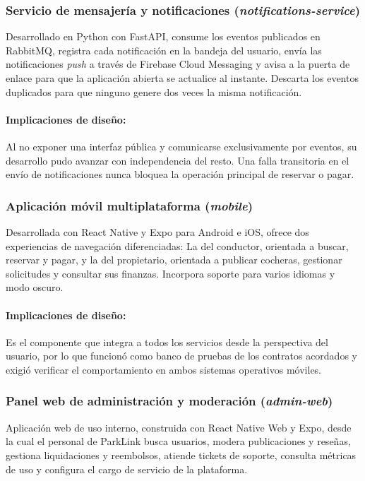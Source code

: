 \subsubsection{Servicio de mensajería y notificaciones (\textit{notifications-service})}

Desarrollado en Python con FastAPI, consume los eventos publicados en RabbitMQ, registra cada notificación en la bandeja del usuario, envía las notificaciones \textit{push} a través de Firebase Cloud Messaging y avisa a la puerta de enlace para que la aplicación abierta se actualice al instante. Descarta los eventos duplicados para que ninguno genere dos veces la misma notificación.

\paragraph{Implicaciones de diseño:} Al no exponer una interfaz pública y comunicarse exclusivamente por eventos, su desarrollo pudo avanzar con independencia del resto. Una falla transitoria en el envío de notificaciones nunca bloquea la operación principal de reservar o pagar.

\subsubsection{Aplicación móvil multiplataforma (\textit{mobile})}

Desarrollada con React Native y Expo para Android e iOS, ofrece dos experiencias de navegación diferenciadas: La del conductor, orientada a buscar, reservar y pagar, y la del propietario, orientada a publicar cocheras, gestionar solicitudes y consultar sus finanzas. Incorpora soporte para varios idiomas y modo oscuro.

\paragraph{Implicaciones de diseño:} Es el componente que integra a todos los servicios desde la perspectiva del usuario, por lo que funcionó como banco de pruebas de los contratos acordados y exigió verificar el comportamiento en ambos sistemas operativos móviles.

\subsubsection{Panel web de administración y moderación (\textit{admin-web})}

Aplicación web de uso interno, construida con React Native Web y Expo, desde la cual el personal de ParkLink busca usuarios, modera publicaciones y reseñas, gestiona liquidaciones y reembolsos, atiende tickets de soporte, consulta métricas de uso y configura el cargo de servicio de la plataforma.

